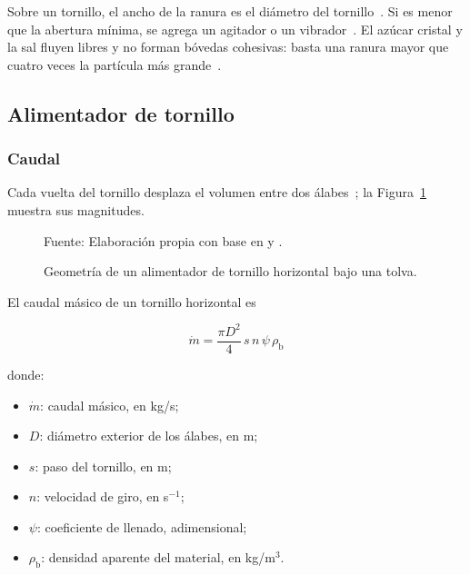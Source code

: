 Sobre un tornillo, el ancho de la ranura es el diámetro del
tornillo~\parencite{mehos2016hopper}. Si es menor que la abertura mínima, se agrega
un agitador o un vibrador~\parencite{bates2000screw}. El azúcar cristal y la
sal fluyen libres y no forman bóvedas cohesivas: basta una ranura mayor que
cuatro veces la partícula más grande~\parencite{bates2000screw}.

\subsection{Alimentador de tornillo}
\label{subsec:fund_alimentacion}

\subsubsection{Caudal}
\label{subsubsec:fund_caudal_tornillo}

Cada vuelta del tornillo desplaza el volumen entre dos
álabes~\parencite{bates2000screw}; la Figura~\ref{fig:tornillo_geometria}
muestra sus magnitudes.

\begin{figure}[H]
    \centering
    \resizebox{0.8\textwidth}{!}{}
    \caption{Geometría de un alimentador de tornillo horizontal bajo una tolva.}
    \label{fig:tornillo_geometria}
    \vspace{0.2em}
    {\footnotesize Fuente: Elaboración propia con base en
    \textcite{bates2000screw} y \textcite{karwat2021screw}.}
\end{figure}

El caudal másico de un tornillo horizontal es~\parencite{karwat2021screw}

\begin{equation}
    \dot{m} = \frac{\pi D^{2}}{4}\, s\, n\, \psi\, \rho_{\mathrm{b}}
    \label{eq:caudal_tornillo}
\end{equation}

\noindent donde:

\begin{itemize}[nosep, label={}, leftmargin=1.5em]
    \item $\dot{m}$: caudal másico, en kg/s;
    \item $D$: diámetro exterior de los álabes, en m;
    \item $s$: paso del tornillo, en m;
    \item $n$: velocidad de giro, en s$^{-1}$;
    \item $\psi$: coeficiente de llenado, adimensional;
    \item $\rho_{\mathrm{b}}$: densidad aparente del material, en kg/m$^{3}$.
\end{itemize}

